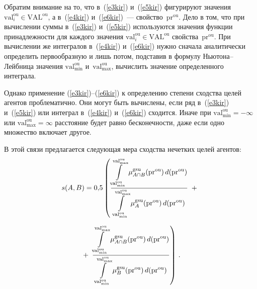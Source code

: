 \begin{multicols}{2}
  Обратим внимание на то, что в~(\ref{e3kir}) и~(\ref{e5kir}) фигурируют 
значения $\mathrm{val}_i^{\mathrm{ou}}\in \mathrm{VAL}^{\mathrm{ou}}$, а в~(\ref{e4kir}) и~(\ref{e6kir})~--- 
свойство~pr$^{\mathrm{ou}}$. Дело в том, что при вычислении суммы в~(\ref{e3kir}) 
и~(\ref{e5kir})  используются значения функции принадлежности для каждого 
значения $\mathrm{val}_i^{\mathrm{ou}}\in \mathrm{VAL}^{\mathrm{ou}}$ свойства~pr$^{\mathrm{ou}}$. При вычислении же 
интегралов в~(\ref{e4kir}) и~(\ref{e6kir})  нужно сначала аналитически 
определить первообразную и лишь потом, подставив в формулу 
  Ньютона--Лейбница значения $\mathrm{val}^{\mathrm{ou}}_{\min}$ и~$\mathrm{val}^{\mathrm{ou}}_{\max}$, 
вычислить значение определенного интеграла.
  
  Однако применение (\ref{e3kir})--(\ref{e6kir})  к определению степени 
сходства целей агентов проблематично. Они могут быть вычислены, если ряд 
в~(\ref{e3kir}) и~(\ref{e5kir})  или интеграл в~(\ref{e4kir}) и~(\ref{e6kir}) 
сходится. Иначе при $\mathrm{val}^{\mathrm{ou}}_{\min} =-\infty$ или $\mathrm{val}^{\mathrm{ou}}_{\max} =\infty$ 
расстояние будет равно бесконечности, даже если одно множество включает 
другое.
  
  В этой связи предлагается следующая мера сходства нечетких целей агентов:
  \begin{multline}
  s(A,B) = 0{,}5\left ( \displaystyle\frac{\displaystyle \int\limits_{\mathrm{val}_{\min}^{\mathrm{ou}}}^{ \mathrm{val}_{\max}^{\mathrm{ou}}} 
\mu^{\mathrm{gsu}}_{A\cap B}(\mathrm{pr}^{\mathrm{ou}})\, d(\mathrm{pr}^{\mathrm{ou}})\mathstrut}{\displaystyle \int\limits_{\mathrm{val}_{\min}^{\mathrm{ou}}}^{\mathrm{val}_{\max}^{\mathrm{ou}}} 
\mu^{\mathrm{gsu}}_{A}(\mathrm{pr}^{\mathrm{ou}}) \,d(\mathrm{pr}^{\mathrm{ou}})\mathstrut}\;+{}\right.\\[6pt]
\left.{}+\;
\displaystyle\frac{\displaystyle \int\limits_{\mathrm{val}_{\min}^{\mathrm{ou}}}^{ \mathrm{val}_{\max}^{\mathrm{ou}}} 
\mu^{\mathrm{gsu}}_{A\cap B}(\mathrm{pr}^{\mathrm{ou}})\, d(\mathrm{pr}^{\mathrm{ou}})\mathstrut}{\displaystyle \int\limits_{\mathrm{val}_{\min}^{\mathrm{ou}}}^{\mathrm{val}_{\max}^{\mathrm{ou}}}
\mu^{\mathrm{gsu}}_{B}(\mathrm{pr}^{\mathrm{ou}})\, d(\mathrm{pr}^{\mathrm{ou}})\mathstrut}\right )\,.
  \label{e7kir}
  \end{multline}
  
   \begin{figure*} %
    \begin{center}
\vspace*{1pt}
\mbox{%
\epsfxsize=102.278mm
}
\end{center}
\vspace*{-6pt}
\vspace*{6pt}
\end{figure*}


\end{multicols}
